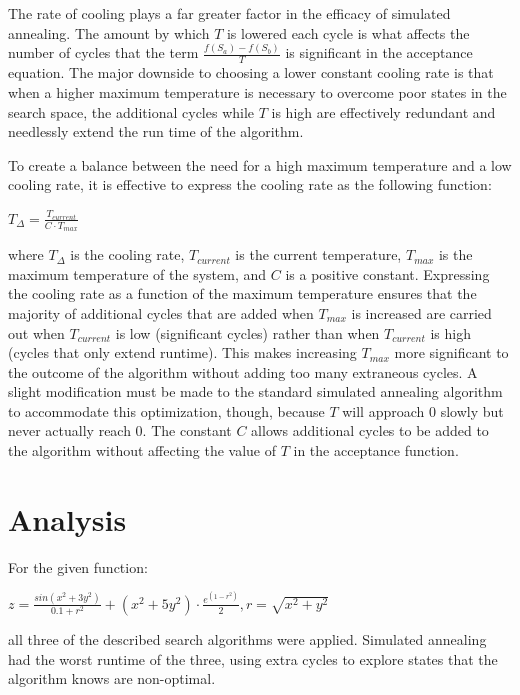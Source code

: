 \documentclass[10pt,a4paper,titlepage]{article}
\begin{document}
The rate of cooling plays a far greater factor in the efficacy of simulated annealing.  The amount by which $T$ is lowered each cycle is what affects the number of cycles that the term $\frac{f(S_a) - f(S_b)}{T}$ is significant in the acceptance equation.  The major downside to choosing a lower constant cooling rate is that when a higher maximum temperature is necessary to overcome poor states in the search space, the additional cycles while $T$ is high are effectively redundant and needlessly extend the run time of the algorithm.

To create a balance between the need for a high maximum temperature and a low cooling rate, it is effective to express the cooling rate as the following function:

\LARGE
\begin{center}
$T_\Delta = \frac{T_{current}}{C \cdot T_{max}}$
\end{center}

\normalsize
where $T_\Delta$ is the cooling rate, $T_{current}$ is the current temperature, $T_{max}$ is the maximum temperature of the system, and $C$ is a positive constant.  Expressing the cooling rate as a function of the maximum temperature ensures that the majority of additional cycles that are added when $T_{max}$ is increased are carried out when $T_{current}$ is low (significant cycles) rather than when $T_{current}$ is high (cycles that only extend runtime).  This makes increasing $T_{max}$ more significant to the outcome of the algorithm without adding too many extraneous cycles.  A slight modification must be made to the standard simulated annealing algorithm to accommodate this optimization, though, because $T$ will approach 0 slowly but never actually reach 0.  The constant $C$ allows additional cycles to be added to the algorithm without affecting the value of $T$ in the acceptance function.

\newpage
\section{Analysis}
For the given function:
\LARGE
\begin{center}
$z = \frac{sin(x^2+3y^2)}{0.1+r^2}+(x^2+5y^2)\cdot\frac{e^{(1-r^2)}}{2},r=\sqrt{x^2+y^2}$
\end{center}
\normalsize
all three of the described search algorithms were applied.  Simulated annealing had the worst runtime of the three, using extra cycles to explore states that the algorithm knows are non-optimal.
\end{document}
